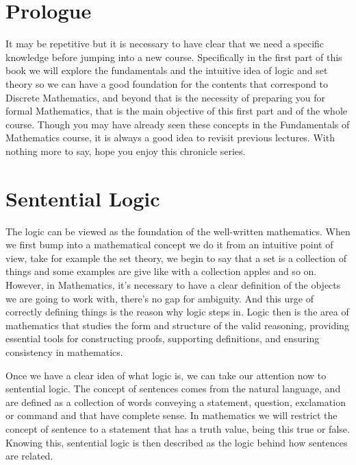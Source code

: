 \documentclass{report}
\begin{document}
    \tableofcontents

    \pagebreak
    \chapter*{ Prologue }

    It may be repetitive but it is necessary to have clear that we need a specific knowledge before jumping into a new course. Specifically in the first part of this book we will explore the fundamentals and the intuitive idea of logic and set theory so we can have a good foundation for the contents that correspond to Discrete Mathematics, and beyond that is the necessity of preparing you for formal Mathematics, that is the main objective of this first part and of the whole course. Though you may have already seen these concepts in the Fundamentals of Mathematics course, it is always a good idea to revisit previous lectures. With nothing more to say, hope you enjoy this chronicle series.

    \chapter{ Sentential Logic }

    The logic can be viewed as the foundation of the well-written mathematics. When we first bump into a mathematical concept we do it from an intuitive point of view, take for example the set theory, we begin to say that a set is a collection of things and some examples are give like with a collection apples and so on. However, in Mathematics, it's necessary to have a clear definition of the objects we are going to work with, there's no gap for ambiguity. And this urge of correctly defining things is the reason why logic steps in. Logic then is the area of mathematics that studies the form and structure of the valid reasoning, providing essential tools for constructing proofs, supporting definitions, and ensuring consistency in mathematics.

    Once we have a clear idea of what logic is, we can take our attention now to sentential logic. The concept of sentences comes from the natural language, and are defined as a collection of words conveying a statement, question, exclamation or command and that have complete sense. In mathematics we will restrict the concept of sentence to a statement that has a truth value, being this true or false. Knowing this, sentential logic is then described as the logic behind how sentences are related.
\end{document}
